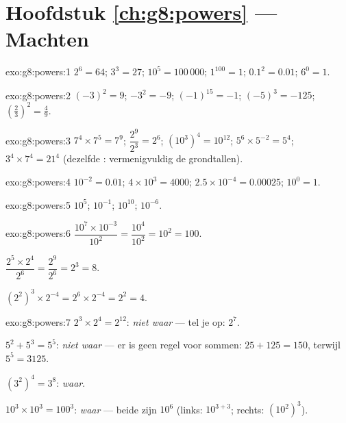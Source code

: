 \section*{Hoofdstuk \ref{ch:g8:powers} --- Machten}

\begin{solution}{exo:g8:powers:1}
$2^6 = 64$; \quad $3^3 = 27$; \quad $10^5 = 100\,000$; \quad
$1^{100} = 1$; \quad $0.1^2 = 0.01$; \quad $6^0 = 1$.
\end{solution}

\begin{solution}{exo:g8:powers:2}
$(-3)^2 = 9$; \quad $-3^2 = -9$; \quad $(-1)^{15} = -1$; \quad
$(-5)^3 = -125$; \quad $\left(\frac23\right)^2 = \frac49$.
\end{solution}

\begin{solution}{exo:g8:powers:3}
$7^4 \times 7^5 = 7^9$; \quad
$\dfrac{2^9}{2^3} = 2^6$; \quad
$\left(10^3\right)^4 = 10^{12}$; \quad
$5^6 \times 5^{-2} = 5^4$; \quad
$3^4 \times 7^4 = 21^4$ (dezelfde : vermenigvuldig de grondtallen).
\end{solution}

\begin{solution}{exo:g8:powers:4}
$10^{-2} = 0.01$; \quad
$4 \times 10^3 = 4000$; \quad
$2.5 \times 10^{-4} = 0.00025$; \quad
$10^0 = 1$.
\end{solution}

\begin{solution}{exo:g8:powers:5}
$10^5$; \quad $10^{-1}$; \quad $10^{10}$; \quad $10^{-6}$.
\end{solution}

\begin{solution}{exo:g8:powers:6}
$\dfrac{10^7 \times 10^{-3}}{10^2} = \dfrac{10^4}{10^2} = 10^2 = 100$.

$\dfrac{2^5 \times 2^4}{2^6} = \dfrac{2^9}{2^6} = 2^3 = 8$.

$\left(2^2\right)^3 \times 2^{-4} = 2^6 \times 2^{-4} = 2^2 = 4$.
\end{solution}

\begin{solution}{exo:g8:powers:7}
$2^3 \times 2^4 = 2^{12}$: \emph{niet waar} ---  tel je op: $2^7$.

$5^2 + 5^3 = 5^5$: \emph{niet waar} --- er is geen regel voor sommen:
$25 + 125 = 150$, terwijl $5^5 = 3125$.

$(3^2)^4 = 3^8$: \emph{waar}.

$10^3 \times 10^3 = 100^3$: \emph{waar} --- beide zijn $10^6$ (links:
$10^{3+3}$; rechts: $(10^2)^3$).
\end{solution}

